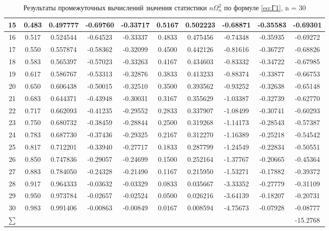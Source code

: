 \begin{table} [h]
{\begin{minipage}{\textwidth}
\begin{tabular}{|c|c|c|c|c|c|c|c|c|c|}
15 &  0.483 &  0.497777 &  -0.69760 &  -0.33717 &  0.5167 &  0.502223 &  -0.68871 &  -0.35583 &  -0.69301 \\ \hline
16 &  0.517 &  0.524544 &  -0.64523 &  -0.33337 &  0.4833 &  0.475456 &  -0.74348 &  -0.35935 &  -0.69272 \\ \hline
17 &  0.550 &  0.557874 &  -0.58362 &  -0.32099 &  0.4500 &  0.442126 &  -0.81616 &  -0.36727 &  -0.68826 \\ \hline
18 &  0.583 &  0.565397 &  -0.57023 &  -0.33263 &  0.4167 &  0.434603 &  -0.83332 &  -0.34722 &  -0.67985 \\ \hline
19 &  0.617 &  0.586767 &  -0.53313 &  -0.32876 &  0.3833 &  0.413233 &  -0.88374 &  -0.33877 &  -0.66753 \\ \hline
20 &  0.650 &  0.606438 &  -0.50015 &  -0.32510 &  0.3500 &  0.393562 &  -0.93252 &  -0.32638 &  -0.65148 \\ \hline
21 &  0.683 &  0.644371 &  -0.43948 &  -0.30031 &  0.3167 &  0.355629 &  -1.03387 &  -0.32739 &  -0.62770 \\ \hline
22 &  0.717 &  0.662093 &  -0.41235 &  -0.29552 &  0.2833 &  0.337907 &  -1.08499 &  -0.30741 &  -0.60293 \\ \hline
23 &  0.750 &  0.680732 &  -0.38459 &  -0.28844 &  0.2500 &  0.319268 &  -1.14173 &  -0.28543 &  -0.57387 \\ \hline
24 &  0.783 &  0.687730 &  -0.37436 &  -0.29325 &  0.2167 &  0.312270 &  -1.16389 &  -0.25218 &  -0.54542 \\ \hline
25 &  0.817 &  0.712201 &  -0.33940 &  -0.27717 &  0.1833 &  0.287799 &  -1.24549 &  -0.22834 &  -0.50551 \\ \hline
26 &  0.850 &  0.747836 &  -0.29057 &  -0.24699 &  0.1500 &  0.252164 &  -1.37767 &  -0.20665 &  -0.45364 \\ \hline
27 &  0.883 &  0.784050 &  -0.24328 &  -0.21490 &  0.1167 &  0.215950 &  -1.53271 &  -0.17882 &  -0.39372 \\ \hline
28 &  0.917 &  0.964333 &  -0.03632 &  -0.03329 &  0.0833 &  0.035667 &  -3.33352 &  -0.27779 &  -0.31109 \\ \hline
29 &  0.950 &  0.973784 &  -0.02657 &  -0.02524 &  0.0500 &  0.026216 &  -3.64139 &  -0.18207 &  -0.20731 \\ \hline
30 &  0.983 &  0.991406 &  -0.00863 &  -0.00849 &  0.0167 &  0.008594 &  -4.75673 &  -0.07928 &  -0.08777 \\ \hline
	$\sum$ & & & & & & & & & -15.2768\\
	\hline
\end{tabular}
\end{minipage} }
\caption{Результаты промежуточных вычислений значения статистики $n\Omega_n^2$ по формуле \ref{eq:Г1}, n = 30} \label{tab:nomega} 
\end{table} 